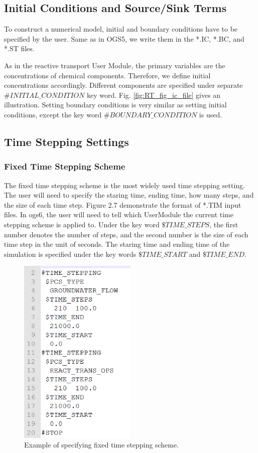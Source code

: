 \subsection{Initial Conditions and Source/Sink Terms}

To construct a numerical model, initial and boundary conditions have to be specified by the user. Same as in OGS5, we write them in the *.IC, *.BC, and *.ST files. 

As in the reactive transport User Module, the primary variables are the concentrations of chemical components. Therefore, we define initial concentrations accordingly. Different components are specified under separate $\#INITIAL\_CONDITION$ key word. Fig. \ref{fig:RT_fig_ic_file} gives an illustration. Setting boundary conditions is very similar as setting initial conditions, except the key word $\#BOUNDARY\_CONDITION$ is used. 

\subsection{Time Stepping Settings}

\subsubsection{Fixed Time Stepping Scheme}

The fixed time stepping scheme is the most widely used time stepping setting. The user will need to specify the staring time, ending time, how many steps, and the size of each time step. Figure 2.7 demonstrate the format of *.TIM input files. In ogs6, the user will need to tell which UserModule the current time stepping scheme is applied to. Under the key word $\$TIME\_STEPS$, the first number denotes the number of steps, and the second number is the size of each time step in the unit of seconds. The staring time and ending time of the simulation is specified under the key words $\$TIME\_START$ and $\$TIME\_END$. 

\begin{figure}
\includegraphics[width=0.5\textwidth]{RT/figs/RT_fig_fixed_tim}
\caption{Example of specifying fixed time stepping scheme. }
\label{fig:RT_fig_fixed_tim}
\end{figure}

